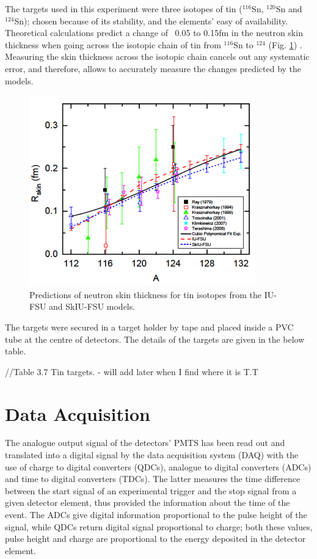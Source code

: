 \indent The targets used in this experiment were three isotopes of tin ($^{116}$Sn, $^{120}$Sn and $^{124}$Sn); chosen because of its stability, and the elements' easy of availability. Theoretical  calculations  predict  a change of  ~0.05  to  0.15fm  in  the neutron  skin thickness when going across the isotopic chain of tin from $^{116}$Sn to $^{124}$ (Fig. \ref{isochain}) \cite{liewen}. Measuring the skin thickness across the  isotopic  chain  cancels  out  any systematic error,  and  therefore,  allows  to accurately measure the changes predicted by the models.


\begin{figure}[H]
\begin{center}
\includegraphics[scale=0.8]{tiniso.png}
\caption{Predictions of neutron skin thickness for tin isotopes from the IU-FSU and SkIU-FSU models.}
\label{isochain}
\end{center}
\end{figure} 

\indent The targets were secured in a target holder by tape and placed inside a PVC tube at the centre of detectors. The details of the targets are given in the below table.

//Table 3.7 Tin targets. - will add later when I find where it is T.T 

\section{Data Acquisition}

\indent The analogue output signal of the detectors' PMTS has been read out and translated into a digital signal by the data acquisition system (DAQ) with the use of charge to digital converters (QDCs), analogue to digital converters (ADCs) and time to digital converters (TDCs). The latter measures the time difference between the start signal of an experimental trigger and the stop signal from a given detector element, thus provided the information about the time of the event. The ADCs give digital information proportional to the pulse height of the signal, while QDCs return digital signal proportional to charge; both these values, pulse height and charge are proportional to the energy deposited in the detector element.


